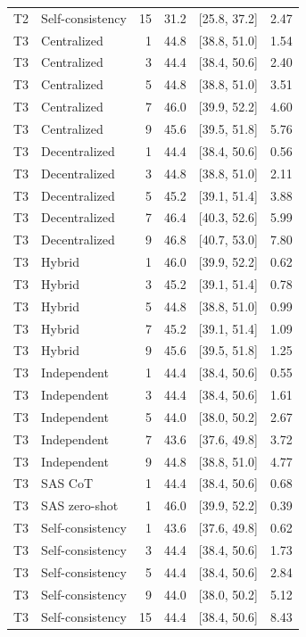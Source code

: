 \begin{tabular}{@{}llrrrr@{}}
T2 & Self-consistency & 15 & 31.2 & [25.8, 37.2] & 2.47 \\
T3 & Centralized & 1 & 44.8 & [38.8, 51.0] & 1.54 \\
T3 & Centralized & 3 & 44.4 & [38.4, 50.6] & 2.40 \\
T3 & Centralized & 5 & 44.8 & [38.8, 51.0] & 3.51 \\
T3 & Centralized & 7 & 46.0 & [39.9, 52.2] & 4.60 \\
T3 & Centralized & 9 & 45.6 & [39.5, 51.8] & 5.76 \\
T3 & Decentralized & 1 & 44.4 & [38.4, 50.6] & 0.56 \\
T3 & Decentralized & 3 & 44.8 & [38.8, 51.0] & 2.11 \\
T3 & Decentralized & 5 & 45.2 & [39.1, 51.4] & 3.88 \\
T3 & Decentralized & 7 & 46.4 & [40.3, 52.6] & 5.99 \\
T3 & Decentralized & 9 & 46.8 & [40.7, 53.0] & 7.80 \\
T3 & Hybrid & 1 & 46.0 & [39.9, 52.2] & 0.62 \\
T3 & Hybrid & 3 & 45.2 & [39.1, 51.4] & 0.78 \\
T3 & Hybrid & 5 & 44.8 & [38.8, 51.0] & 0.99 \\
T3 & Hybrid & 7 & 45.2 & [39.1, 51.4] & 1.09 \\
T3 & Hybrid & 9 & 45.6 & [39.5, 51.8] & 1.25 \\
T3 & Independent & 1 & 44.4 & [38.4, 50.6] & 0.55 \\
T3 & Independent & 3 & 44.4 & [38.4, 50.6] & 1.61 \\
T3 & Independent & 5 & 44.0 & [38.0, 50.2] & 2.67 \\
T3 & Independent & 7 & 43.6 & [37.6, 49.8] & 3.72 \\
T3 & Independent & 9 & 44.8 & [38.8, 51.0] & 4.77 \\
T3 & SAS CoT & 1 & 44.4 & [38.4, 50.6] & 0.68 \\
T3 & SAS zero-shot & 1 & 46.0 & [39.9, 52.2] & 0.39 \\
T3 & Self-consistency & 1 & 43.6 & [37.6, 49.8] & 0.62 \\
T3 & Self-consistency & 3 & 44.4 & [38.4, 50.6] & 1.73 \\
T3 & Self-consistency & 5 & 44.4 & [38.4, 50.6] & 2.84 \\
T3 & Self-consistency & 9 & 44.0 & [38.0, 50.2] & 5.12 \\
T3 & Self-consistency & 15 & 44.4 & [38.4, 50.6] & 8.43 \\

\end{tabular}
